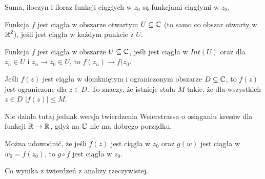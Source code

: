 Suma, iloczyn i iloraz funkcji ciągłych w $z_0$ są funkcjami ciągłymi w $z_0$. 

\begin{definition} 
  Funkcja $f$ jest ciągła w obszarze otwartym $U\subseteq \operatorname{\mathbb{C}}$ (to samo co obszar otwarty w $\operatorname{\mathbb{R}}^2$), jeśli jest ciągła w każdym punkcie z $U$.

  Funkcja $f$ jest ciągła w obszarze $U\subseteq \operatorname{\mathbb{C}}$, jeśli jest ciągła w $Int(U)$ oraz dla $z_n\in U$ i $z_n\to z_0\in U$, to $f(z_n)\to f(z_0$.
\end{definition}

\begin{theorem}[Weierstrassa]
  Jeśli $f(z)$ jest ciągła w domkniętym i ograniczonym obszarze $D\subseteq\operatorname{\mathbb{C}}$, to $f(z)$ jest ograniczone dla $z\in D$. To znaczy, że istnieje stała $M$ takie, że dla wszystkich $z\in D$ $|f(z)|\leq M$.
\end{theorem}

Nie działa tutaj jednak wersja twierdzenia Weierstrassa o osiąganiu kresów dla funkcji $\operatorname{\mathbb{R}}\to\operatorname{\mathbb{R}}$, gdyż na $\operatorname{\mathbb{C}}$ nie ma dobrego porządku.

\begin{lemma}
  Można udowodnić, że jeśli $f(z)$ jest ciągła w $z_0$ oraz $g(w)$ jest ciągła w $w_0=f(z_0)$, to $g\circ f$ jest ciągła w $z_0$.
\end{lemma}

Co wynika z twierdzeń z analizy rzeczywistej.

  
